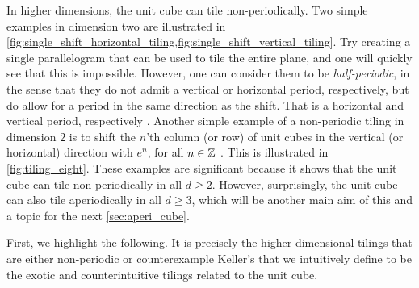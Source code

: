 \documentclass[../thesis.tex]{subfiles}
\begin{document}
In higher dimensions, the unit cube can tile non-periodically. Two simple examples in dimension two are illustrated in \cref{fig:single_shift_horizontal_tiling,fig:single_shift_vertical_tiling}. Try creating a single parallelogram that can be used to tile the entire plane, and one will quickly see that this is impossible. However, one can consider them to be \emph{half-periodic}, in the sense that they do not admit a vertical or horizontal period, respectively, but do allow for a period in the same direction as the shift. That is a horizontal and vertical period, respectively \cite{kolountzakisTilingsTranslation2010}. Another simple example of a non-periodic tiling in dimension $2$ is to shift the $n$'th column (or row) of unit cubes in the vertical (or horizontal) direction with $e^n$, for all $n\in\mathbb{Z}$ \cite{liuUniformityNonUniformGabor2003}. This is illustrated in \cref{fig:tiling_eight}. These examples are significant because it shows that the unit cube can tile non-periodically in all $d\geq 2$. However, surprisingly, the unit cube can also tile aperiodically in all $d\geq 3$, which will be another main aim of this  and a topic for the next \cref{sec:aperi_cube}.

First, we highlight the following. It is precisely the higher dimensional tilings that are either non-periodic or counterexample Keller's  that we intuitively define to be the exotic and counterintuitive tilings related to the unit cube.
\end{document}
